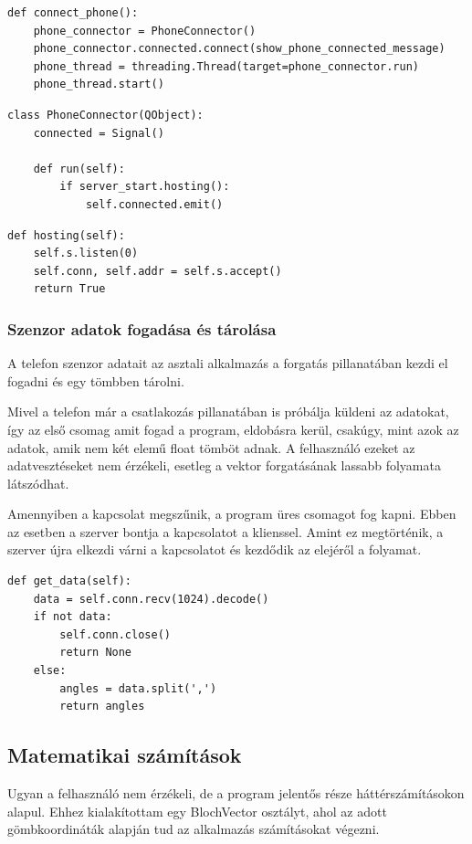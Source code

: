 \documentclass[
]{thesis-ekf}
\theoremstyle{definition}
\theoremstyle{remark}
\begin{document}
\begin{lstlisting}[caption={A Window osztály példányosítása előtt elindított metódus}]
def connect_phone():
	phone_connector = PhoneConnector()
	phone_connector.connected.connect(show_phone_connected_message)
	phone_thread = threading.Thread(target=phone_connector.run)
	phone_thread.start()
\end{lstlisting}

\begin{lstlisting}[caption={PhoneConnector osztály}]
class PhoneConnector(QObject):
	connected = Signal()

	def run(self):
		if server_start.hosting():
			self.connected.emit()
\end{lstlisting}

\begin{lstlisting}[caption={A csatlakozást váró függvény a Server osztályban}]
def hosting(self):
	self.s.listen(0)
	self.conn, self.addr = self.s.accept()
	return True
\end{lstlisting}

\subsubsection{Szenzor adatok fogadása és tárolása}
A telefon szenzor adatait az asztali alkalmazás a forgatás pillanatában kezdi el fogadni és egy tömbben tárolni. 

Mivel a telefon már a csatlakozás pillanatában is próbálja küldeni az adatokat, így az első csomag amit fogad a program, eldobásra kerül, csakúgy, mint azok az adatok, amik nem két elemű float tömböt adnak. A felhasználó ezeket az adatvesztéseket nem érzékeli, esetleg a vektor forgatásának lassabb folyamata látszódhat.

Amennyiben a kapcsolat megszűnik, a program üres csomagot fog kapni. Ebben az esetben a szerver bontja a kapcsolatot a klienssel. Amint ez megtörténik, a szerver újra elkezdi várni a kapcsolatot és kezdődik az elejéről a folyamat.

\begin{lstlisting}[caption={Szenzor adatok fogadása és tárolása valamint kapcsolat bontása}]
def get_data(self):
	data = self.conn.recv(1024).decode()
	if not data:
		self.conn.close()
		return None
	else:
		angles = data.split(',')
		return angles
\end{lstlisting}

\subsection{Matematikai számítások}
Ugyan a felhasználó nem érzékeli, de a program jelentős része háttérszámításokon alapul. Ehhez kialakítottam egy BlochVector osztályt, ahol az adott gömbkoordináták alapján tud az alkalmazás számításokat végezni.
\end{document}
